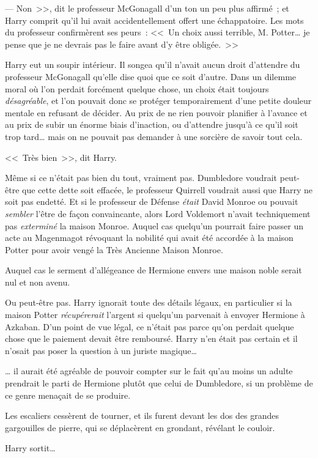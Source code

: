 --- Non~>>, dit le professeur McGonagall d'un ton un peu plus affirmé~; et Harry comprit qu'il lui avait accidentellement offert une échappatoire. Les mots du professeur confirmèrent ses peurs~: <<~Un choix aussi terrible, M. Potter… je pense que je ne devrais pas le faire avant d'y être obligée.~>>

Harry eut un soupir intérieur. Il songea qu'il n'avait aucun droit d'attendre du professeur McGonagall qu'elle dise quoi que ce soit d'autre. Dans un dilemme moral où l'on perdait forcément quelque chose, un choix était toujours \emph{désagréable}, et l'on pouvait donc se protéger temporairement d'une petite douleur mentale en refusant de décider. Au prix de ne rien pouvoir planifier à l'avance et au prix de subir un énorme biais d'inaction, ou d'attendre jusqu'à ce qu'il soit trop tard… mais on ne pouvait pas demander à une sorcière de savoir tout cela.

<<~Très bien~>>, dit Harry.

Même si ce n'était pas bien du tout, vraiment pas. Dumbledore voudrait peut-être que cette dette soit effacée, le professeur Quirrell voudrait aussi que Harry ne soit pas endetté. Et si le professeur de Défense \emph{était} David Monroe ou pouvait \emph{sembler} l'être de façon convaincante, alors Lord Voldemort n'avait techniquement pas \emph{exterminé} la maison Monroe. Auquel cas quelqu'un pourrait faire passer un acte au Magenmagot révoquant la nobilité qui avait été accordée à la maison Potter pour avoir vengé la Très Ancienne Maison Monroe.

Auquel cas le serment d'allégeance de Hermione envers une maison noble serait nul et non avenu.

Ou peut-être pas. Harry ignorait toute des détails légaux, en particulier si la maison Potter \emph{récupérerait} l'argent si quelqu'un parvenait à envoyer Hermione à Azkaban. D'un point de vue légal, ce n'était pas parce qu'on perdait quelque chose que le paiement devait être remboursé. Harry n'en était pas certain et il n'osait pas poser la question à un juriste magique…

… il aurait été agréable de pouvoir compter sur le fait qu'au moins un adulte prendrait le parti de Hermione plutôt que celui de Dumbledore, si un problème de ce genre menaçait de se produire.

Les escaliers cessèrent de tourner, et ils furent devant les dos des grandes gargouilles de pierre, qui se déplacèrent en grondant, révélant le couloir.

Harry sortit…

